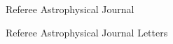 




\begin{cventries}

\cvsimpentry
{Referee}
{Astrophysical Journal}
{}
{}

\cvsimpentry
{Referee}
{Astrophysical Journal Letters}
{}
{}
\end{cventries}




